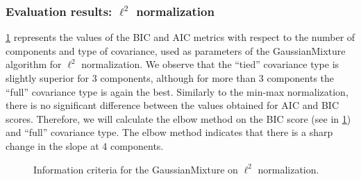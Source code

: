 \subsubsection*{Evaluation results: $\ell^2$ normalization}

\cref{fig:plot-l2-bic} represents the values of the BIC and AIC metrics with respect to the number of components and type of covariance, used as parameters of the GaussianMixture algorithm for $\ell^2$ normalization. We observe that the ``tied'' covariance type is slightly superior for 3 components, although for more than 3 components the ``full'' covariance type is again the best. Similarly to the min-max normalization, there is no significant difference between the values obtained for AIC and BIC scores. Therefore, we will calculate the elbow method on the BIC score (see in \cref{fig:plot-l2-bic}) and ``full'' covariance type. The elbow method indicates that there is a sharp change in the slope at 4 components.


\begin{figure}
    \centering
    \caption{Information criteria for the GaussianMixture on $\ell^2$ normalization.}
    \label{fig:plot-l2-bic}
\end{figure}

 

